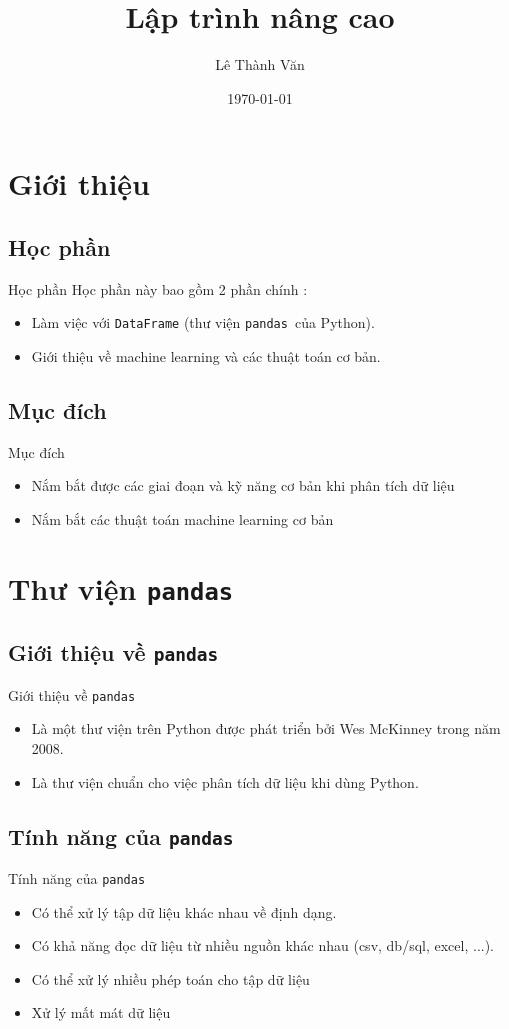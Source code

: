 \documentclass[11pt]{beamer}
\author{Lê Thành Văn}
\title{Lập trình nâng cao}
\institute{Khoa Hệ thống thông tin quản lý}
\date{\today}
\newcommand{\pandas}{\texttt{pandas}}
\begin{document}
\begin{frame}
\titlepage
\end{frame}

\section{Giới thiệu}
\subsection{Học phần}
\begin{frame}{Học phần}
Học phần này bao gồm 2 phần chính :
\begin{itemize}
\item Làm việc với \texttt{DataFrame} (thư viện \pandas\ của Python).
\item Giới thiệu về machine learning và các thuật toán cơ bản.
\end{itemize}
\end{frame}
\subsection{Mục đích}
\begin{frame}{Mục đích}
\begin{itemize}
\item Nắm bắt được các giai đoạn và kỹ năng cơ bản khi phân tích dữ liệu
\item Nắm bắt các thuật toán machine learning cơ bản
\end{itemize}
\end{frame}
\section{Thư viện \pandas}
\subsection{Giới thiệu về \pandas}
\begin{frame}{Giới thiệu về \pandas}
\begin{itemize}
\item Là một thư viện trên Python được phát triển bởi Wes McKinney trong năm 2008.
\item Là thư viện chuẩn cho việc phân tích dữ liệu khi dùng Python.
\end{itemize}
\end{frame}
\subsection{Tính năng của \pandas}
\begin{frame}{Tính năng của \pandas}
\begin{itemize}
\item Có thể xử lý tập dữ liệu khác nhau về định dạng.
\item Có khả năng đọc dữ liệu từ nhiều nguồn khác nhau (csv, db/sql, excel, ...).
\item Có thể xử lý nhiều phép toán cho tập dữ liệu
\item Xử lý mất mát dữ liệu
\end{itemize}
\end{frame}
\end{document}

